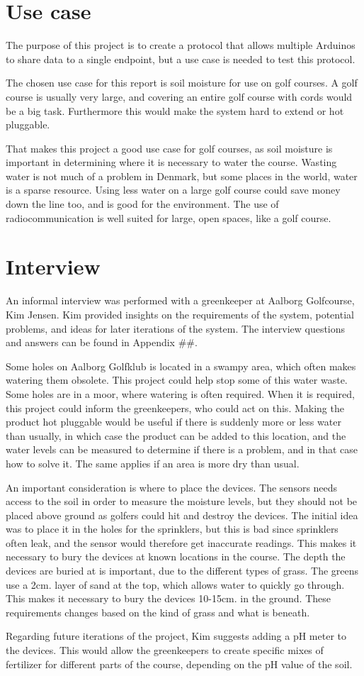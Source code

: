 \section{Use case}
The purpose of this project is to create a protocol that allows multiple Arduinos to share data to a single endpoint, but a use case is needed to test this protocol.

The chosen use case for this report is soil moisture for use on golf courses. A golf course is usually very large, and covering an entire golf course with cords would be a big task. Furthermore this would make the system hard to extend or hot pluggable.

That makes this project a good use case for golf courses, as soil moisture is important in determining where it is necessary to water the course. Wasting water is not much of a problem in Denmark, but some places in the world, water is a sparse resource. Using less water on a large golf course could save money down the line too, and is good for the environment. The use of radiocommunication is well suited for large, open spaces, like a golf course.

\section{Interview}
An informal interview was performed with a greenkeeper at Aalborg Golfcourse, Kim Jensen. Kim provided insights on the requirements of the system, potential problems, and ideas for later iterations of the system. The interview questions and answers can be found in Appendix \#\#. 

Some holes on Aalborg Golfklub is located in a swampy area, which often makes watering them obsolete. This project could help stop some of this water waste. Some holes are in a moor, where watering is often required. When it is required, this project could inform the greenkeepers, who could act on this.
Making the product hot pluggable would be useful if there is suddenly more or less water than usually, in which case the product can be added to this location, and the water levels can be measured to determine if there is a problem, and in that case how to solve it. The same applies if an area is more dry than usual.

An important consideration is where to place the devices. The sensors needs access to the soil in order to measure the moisture levels, but they should not be placed above ground as golfers could hit and destroy the devices. The initial idea was to place it in the holes for the sprinklers, but this is bad since sprinklers often leak, and the sensor would therefore get inaccurate readings.
This makes it necessary to bury the devices at known locations in the course. The depth the devices are buried at is important, due to the different types of grass. The greens use a 2cm. layer of sand at the top, which allows water to quickly go through. This makes it necessary to bury the devices 10-15cm. in the ground. These requirements changes based on the kind of grass and what is beneath.

Regarding future iterations of the project, Kim suggests adding a pH meter to the devices. This would allow the greenkeepers to create specific mixes of fertilizer for different parts of the course, depending on the pH value of the soil. 